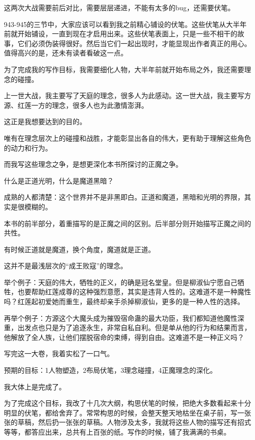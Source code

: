 \begin{this_body}
这两次大战需要前后对比，需要层层递进，不能有太多的bug，还需要伏笔。

943-945的三节中，大家应该可以看到我之前精心铺设的伏笔。这些伏笔从大半年前就开始铺设，一直到现在才启用出来。这些伏笔表面上，只是一些不相干的故事，它们必须伪装得很好。然后当它们一起出现时，才能显现出作者真正的用心。值得高兴的是，还未有读者看破这一点。

为了完成我的写作目标，我需要细化人物，大半年前就开始布局之外，我还需要理念的碰撞。

上一世大战，我主要写了天庭的理念，很多人为此感动。这一世大战，我主要写方源、红莲一方的理念，很多人也为此激情澎湃。

这正是我想要达到的目的。

唯有在理念层次上的碰撞和战胜，才能彰显出各自的伟大，更有助于理解这些角色的动力和行为。

而我写这些理念之争，是想更深化本书所探讨的正魔之争。

什么是正道光明，什么是魔道黑暗？

成熟的人都清楚：这个世界并不是非黑即白。正道和魔道，黑暗和光明的界限，其实是很模糊的。

本书的前半部分，着重描写的是正魔之间的区别。后半部分则开始描写正魔之间的共性。

有时候正道就是魔道，换个角度，魔道就是正道。

这并不是最浅层次的“成王败寇”的理念。

举个例子：天庭的伟大，牺牲的正义，的确是冠名堂皇。但是柳淑仙宁愿自己牺牲，也要帮助红莲成尊的这种强烈意愿，其实是违背人性的。这难道不是一种魔性吗？红莲起初爱她而重生，最终却亲手杀掉柳淑仙，更多的是一种人性的选择。

再举个例子：方源这个大魔头成为摧毁宿命蛊的最大功臣，我们都知道他魔性深重，出发点也只是为了追逐永生，非常自私自利。但是单从他的行为和结果而言，他解放了全人族，让他们摆脱宿命的束缚，得到自由。这难道不是一种正义吗？

写完这一大卷，我着实松了一口气。

预期的目标：1人物塑造，2布局伏笔，3理念碰撞，4正魔理念的深化。

我大体上是完成了。

为了完成这个目标，我改了十几次大纲，构思伏笔的时候，把绝大多数看起来十分明显的伏笔，都给舍弃了。常常构思的时候，会整天整天地枯坐在桌子前，写一张张的草稿，然后扔一张张的草稿。人物涉及太多，我就将这些人物的描写还有招式等等，都答应出来，总共有上百张的纸。写作的时候，铺了我满满的书桌。


\end{this_body}
